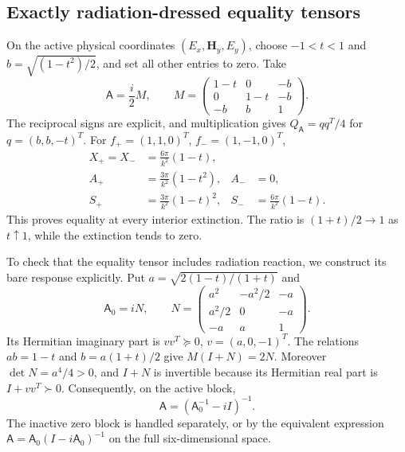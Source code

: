 \documentclass[11pt,a4paper]{article}
\theoremstyle{remark}
\begin{document}
\subsection{Exactly radiation-dressed equality tensors}
On the active physical coordinates $(E_x,\mathbf H_y,E_y)$, choose $-1<t<1$ and $b=\sqrt{(1-t^2)/2}$, and set all other entries to zero. Take
\begin{equation}\label{eq:equality-tensor}
 \mathsf A=\frac i2M,\qquad M=\begin{pmatrix}1-t&0&-b\\0&1-t&-b\\-b&b&1\end{pmatrix}.
\end{equation}
The reciprocal signs are explicit, and multiplication gives $Q_{\mathsf A}=qq^T/4$ for $q=(b,b,-t)^T$. For $f_+=(1,1,0)^T$, $f_-=(1,-1,0)^T$,
\begin{equation}\label{eq:equality-cross}
 \begin{aligned}
 X_+=X_-&=\frac{6\pi}{k^2}(1-t),\\
 A_+&=\frac{3\pi}{k^2}(1-t^2),& A_-&=0,\\
 S_+&=\frac{3\pi}{k^2}(1-t)^2,&S_-&=\frac{6\pi}{k^2}(1-t).
 \end{aligned}
\end{equation}
This proves equality at every interior extinction. The ratio is $(1+t)/2\to1$ as $t\uparrow1$, while the extinction tends to zero.

To check that the equality tensor includes radiation reaction, we construct its bare response explicitly. Put $a=\sqrt{2(1-t)/(1+t)}$ and
\[
 \mathsf A_0=iN,\qquad
 N=\begin{pmatrix}a^2&-a^2/2&-a\\a^2/2&0&-a\\-a&a&1\end{pmatrix}.
\]
Its Hermitian imaginary part is $vv^T\succeq0$, $v=(a,0,-1)^T$. The relations $ab=1-t$ and $b=a(1+t)/2$ give $M(I+N)=2N$. Moreover $\det N=a^4/4>0$, and $I+N$ is invertible because its Hermitian real part is $I+vv^T\succ0$. Consequently, on the active block,
\begin{equation}\label{eq:radiation-dressing}
 \mathsf A=(\mathsf A_0^{-1}-iI)^{-1}.
\end{equation}
The inactive zero block is handled separately, or by the equivalent expression $\mathsf A=\mathsf A_0(I-i\mathsf A_0)^{-1}$ on the full six-dimensional space.
\end{document}

